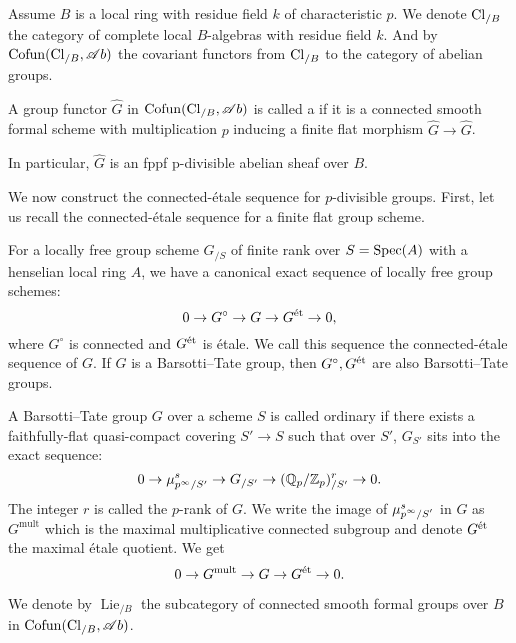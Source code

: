 \documentclass[twoside]{article}
\begin{document}
Assume $B$ is a local ring with residue field $k$ of characteristic $p$.
We denote $\operatorname{Cl}_{/B}$ the category of complete local $B$-algebras 
with residue field $k$.
And by $\operatorname{Cofun}(\operatorname{Cl}_{/B},\mathscr{A}b)$ the covariant functors from $\operatorname{Cl}_{/B}$ to the category of abelian groups.

\begin{definition}\label{def-csfg}
    A group functor $\hat{G}$ in $\operatorname{Cofun} (\operatorname{Cl}_{/B},\mathscr{A}b)$ is called a
     if it is a connected smooth formal scheme
    with multiplication $p$ inducing a finite flat morphism $\hat{G}\to \hat{G}$.
    
    In particular, $\hat{G}$ is an fppf p-divisible abelian sheaf over $B$.
\end{definition}

We now construct the connected-\'etale sequence for $p$-divisible groups.
First, let us recall the connected-\'etale sequence for a finite flat group scheme.

\begin{proposition}
    For a locally free group scheme $G_{/S}$ of finite rank 
    over $S=\operatorname{Spec}(A)$ with a henselian local ring $A$,
    we have a canonical exact sequence of locally free group schemes:
    \[ 0\to G^{\circ}\to G\to G^{\textup{\'et}} \to 0, \]
    where $G^{\circ}$ is connected and $G^{\textup{\'et}}$ is \'etale.
    We call this sequence the connected-\'etale sequence of $G$.
    If $G$ is a Barsotti--Tate group,
    then $G^{\circ},G^{\textup{\'et}}$ are also Barsotti--Tate groups.
\end{proposition}

\begin{definition} 
    A Barsotti--Tate group $G$ over a scheme $S$ is called ordinary 
    if there exists a faithfully-flat quasi-compact covering $S'\to S$
    such that over $S'$, $G_{S'}$ sits into the exact sequence:
    \[ 0\to \mu_{p^{\infty}/S'}^{s}\to G_{/S'} \to (\mathbb{Q}_{p}/\mathbb{Z}_{p})^{r}_{/S'} \to 0. \]
    The integer $r$ is called the $p$-rank of $G$.
    We write the image of $\mu_{\smash{p^{\infty}/S'}}^{s}$ in $G$ as $G^{\mathrm{mult}}$ 
    which is the maximal multiplicative connected subgroup and denote $G^{\textup{\'et}}$ the maximal \'etale quotient.
    We get 
    \[ 0\to G^{\mathrm{mult}} \to G\to G^{\textup{\'et}} \to 0. \]
\end{definition}

We denote by $\operatorname{Lie}_{/B}$ the subcategory of 
connected smooth formal groups over $B$ in $\operatorname{Cofun}(\operatorname{Cl}_{/B},\mathscr{A}b)$.
\end{document}
